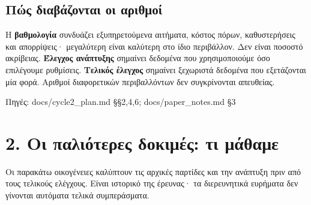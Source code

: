 \documentclass[10pt,a4paper]{article}
\newcommand{\src}[1]{\par{\scriptsize\color{gray}Πηγές: {\ttfamily #1}}\par}
\newcommand{\page}[1]{\clearpage\section*{#1}}
\begin{document}
\subsection*{Πώς διαβάζονται οι αριθμοί}
Η \textbf{βαθμολογία} συνδυάζει εξυπηρετούμενα αιτήματα, κόστος πόρων, καθυστερήσεις και απορρίψεις· μεγαλύτερη είναι καλύτερη στο ίδιο περιβάλλον. Δεν είναι ποσοστό ακρίβειας. \textbf{Έλεγχος ανάπτυξης} σημαίνει δεδομένα που χρησιμοποιούμε όσο επιλέγουμε ρυθμίσεις. \textbf{Τελικός έλεγχος} σημαίνει ξεχωριστά δεδομένα που εξετάζονται μία φορά. Αριθμοί διαφορετικών περιβαλλόντων δεν συγκρίνονται απευθείας.
\src{docs/\allowbreak cycle2\_plan.md §§2,4,6; docs/\allowbreak paper\_notes.md §3}
\page{2. Οι παλιότερες δοκιμές: τι μάθαμε}
Οι παρακάτω οικογένειες καλύπτουν τις αρχικές παρτίδες και την ανάπτυξη πριν από τους τελικούς ελέγχους. Είναι ιστορικό της έρευνας· τα διερευνητικά ευρήματα δεν γίνονται αυτόματα τελικά συμπεράσματα.
\end{document}
